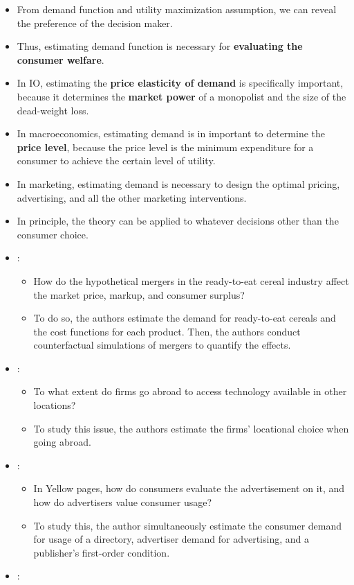 \documentclass[
]{book}
\providecommand{\tightlist}{%
  \setlength{\itemsep}{0pt}\setlength{\parskip}{0pt}}
\begin{document}
\begin{itemize}
\item
  From demand function and utility maximization assumption, we can reveal the preference of the decision maker.
\item
  Thus, estimating demand function is necessary for \textbf{evaluating the consumer welfare}.
\item
  In IO, estimating the \textbf{price elasticity of demand} is specifically important, because it determines the \textbf{market power} of a monopolist and the size of the dead-weight loss.
\item
  In macroeconomics, estimating demand is in important to determine the \textbf{price level}, because the price level is the minimum expenditure for a consumer to achieve the certain level of utility.
\item
  In marketing, estimating demand is necessary to design the optimal pricing, advertising, and all the other marketing interventions.
\item
  In principle, the theory can be applied to whatever decisions other than the consumer choice.
\item
  \citet{Nevo2000c}:

  \begin{itemize}
  \tightlist
  \item
    How do the hypothetical mergers in the ready-to-eat cereal industry affect the market price, markup, and consumer surplus?
  \item
    To do so, the authors estimate the demand for ready-to-eat cereals and the cost functions for each product. Then, the authors conduct counterfactual simulations of mergers to quantify the effects.
  \end{itemize}
\item
  \citet{Chung2002}:

  \begin{itemize}
  \tightlist
  \item
    To what extent do firms go abroad to access technology available in other locations?
  \item
    To study this issue, the authors estimate the firms' locational choice when going abroad.
  \end{itemize}
\item
  \citet{Rysman2004}:

  \begin{itemize}
  \tightlist
  \item
    In Yellow pages, how do consumers evaluate the advertisement on it, and how do advertisers value consumer usage?
  \item
    To study this, the author simultaneously estimate the consumer demand for usage of a directory, advertiser demand for advertising, and a publisher's first-order condition.
  \end{itemize}
\item
  \citet{Gentzkow2004}:


\end{itemize}
\end{document}
